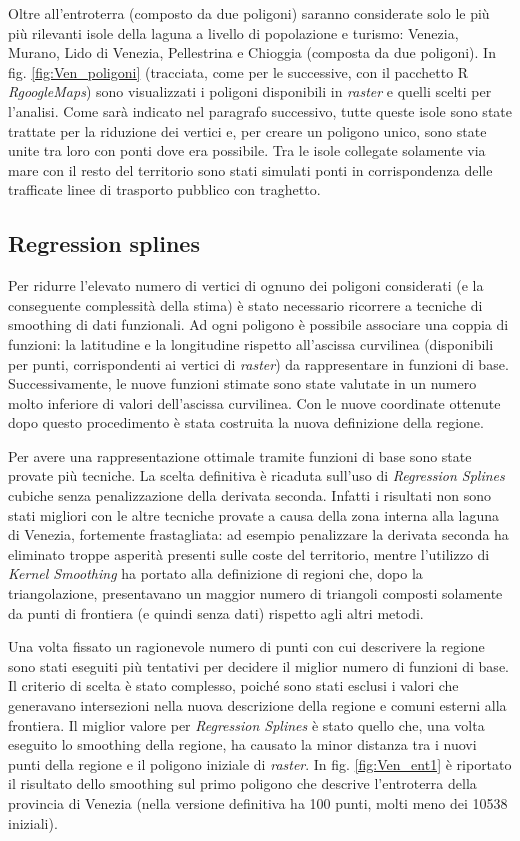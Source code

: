 \documentclass[a4paper,11pt,twoside,openright]{book}							%
\begin{document}
Oltre all'entroterra (composto da due poligoni) saranno considerate solo le più più rilevanti isole della laguna a livello di popolazione e turismo: Venezia, Murano, Lido di Venezia, Pellestrina e Chioggia (composta da due poligoni). In fig. \ref{fig:Ven_poligoni} (tracciata, come per le successive, con il pacchetto R \textit{RgoogleMaps}) sono visualizzati i poligoni disponibili in \textit{raster} e quelli scelti per l'analisi. Come sarà indicato nel paragrafo successivo, tutte queste isole sono state trattate per la riduzione dei vertici e, per creare un poligono unico, sono state unite tra loro con ponti dove era possibile. Tra le isole collegate solamente via mare con il resto del territorio sono stati simulati ponti in corrispondenza delle trafficate linee di trasporto pubblico con traghetto. 

\subsection{Regression splines}

Per ridurre l'elevato numero di vertici di ognuno dei poligoni considerati (e la conseguente complessità della stima) è stato necessario ricorrere a tecniche di smoothing di dati funzionali. Ad ogni poligono è possibile associare una coppia di funzioni: la latitudine e la longitudine rispetto all'ascissa curvilinea (disponibili per punti, corrispondenti ai vertici di \textit{raster}) da rappresentare in funzioni di base. Successivamente, le nuove funzioni stimate sono state valutate in un numero molto inferiore di valori dell'ascissa curvilinea. Con le nuove coordinate ottenute dopo questo procedimento è stata costruita la nuova definizione della regione.

Per avere una rappresentazione ottimale tramite funzioni di base sono state provate più tecniche. La scelta definitiva è ricaduta sull'uso di \textit{Regression Splines} cubiche senza penalizzazione della derivata seconda. Infatti i risultati non sono stati migliori con le altre tecniche provate a causa della zona interna alla laguna di Venezia, fortemente frastagliata: ad esempio penalizzare la derivata seconda ha eliminato troppe asperità presenti sulle coste del territorio, mentre l'utilizzo di \textit{Kernel Smoothing} ha portato alla definizione di regioni che, dopo la triangolazione, presentavano un maggior numero di triangoli composti solamente da punti di frontiera (e quindi senza dati) rispetto agli altri metodi.

Una volta fissato un ragionevole numero di punti con cui descrivere la regione sono stati eseguiti più tentativi per decidere il miglior numero di funzioni di base. Il criterio di scelta è stato complesso, poiché sono stati esclusi i valori che generavano intersezioni nella nuova descrizione della regione e comuni esterni alla frontiera. Il miglior valore per \textit{Regression Splines} è stato quello che, una volta eseguito lo smoothing della regione, ha causato la minor distanza tra i nuovi punti della regione e il poligono iniziale di \textit{raster}. In fig. \ref{fig:Ven_ent1} è riportato il risultato dello smoothing sul primo poligono che descrive l'entroterra della provincia di Venezia (nella versione definitiva ha 100 punti, molti meno dei 10538 iniziali).  
\end{document}
